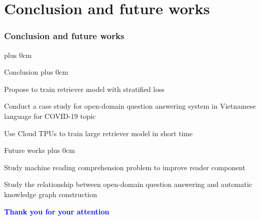 \documentclass[11pt]{beamer}
\renewcommand{\raggedright}{\leftskip=0pt \rightskip=0pt plus 0cm}
\let\olditemize=\itemize
\renewenvironment{itemize}{\olditemize\raggedright}{\endlist}
\begin{document}
\section{Conclusion and future works}
\begin{frame}
\frametitle{Conclusion and future works}
\begin{center}
	\begin{itemize}
		\item Conclusion
		\begin{itemize}
			\item Propose to train retriever model with stratified loss
			\item Conduct a case study for open-domain question answering system in Vietnamese language for COVID-19 topic
			\item Use Cloud TPUs to train large retriever model in short time
		\end{itemize}
		\item Future works
		\begin{itemize}
			\item Study machine reading comprehension problem to improve reader component
			\item Study the relationship between open-domain question answering and automatic knowledge graph construction
		\end{itemize}
	\end{itemize}
\end{center}
\end{frame}
\begin{frame}[plain]
	\begin{center}
		\textcolor{blue}{\fontsize{20pt}{\baselineskip}\selectfont\bfseries Thank you for your attention}
	\end{center}
\end{frame}
\end{document}
